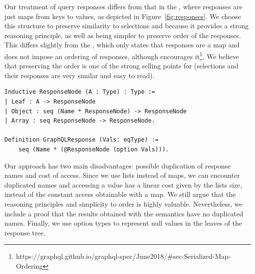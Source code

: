 

Our treatment of query responses differs from that in the \spec, where responses are just maps from keys to values,
as depicted in Figure~\ref{fig:responses}. We choose this structure to preserve similarity to selections and because it provides a strong reasoning principle, as well as being simpler to preserve order of the responses. This differs slightly from the \spec, which only states that responses are a map and does not impose an ordering of responses, although encourages it\footnote{https://graphql.github.io/graphql-spec/June2018/\#sec-Serialized-Map-Ordering}. We believe that preserving the order is one of the strong selling points for \gql (selections and their responses are very similar and easy to read). 

\begin{verbatim}
Inductive ResponseNode (A : Type) : Type :=
| Leaf : A -> ResponseNode
| Object : seq (Name * ResponseNode) -> ResponseNode
| Array : seq ResponseNode -> ResponseNode.

Definition GraphQLResponse (Vals: eqType) :=
    seq (Name * (@ResponseNode (option Vals))).
\end{verbatim}

 Our approach has two main disadvantages: possible duplication of response names and cost of access. Since we use lists instead of maps, we can encounter duplicated names and accessing a value has a linear cost given by the lists size, instead of the constant access obtainable with a map. We still argue that the reasoning principles and simplicity to order is highly valuable. Nevertheless, we include a proof that the results obtained with the semantics have no duplicated names. Finally, we use option types to represent null values in the leaves of the response tree.



